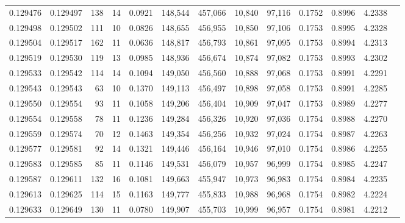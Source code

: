 \begin{tabular}{rrrrrrrrrrrrr}
0.129476 & 0.129497 &   138 &  14 &                                     0.0921 & 148,544 & 457,066 &  10,840 &  97,116 & 0.1752 & 0.8996 & 4.2338 \\
0.129498 & 0.129502 &   111 &  10 &                                     0.0826 & 148,655 & 456,955 &  10,850 &  97,106 & 0.1753 & 0.8995 & 4.2328 \\
0.129504 & 0.129517 &   162 &  11 &                                     0.0636 & 148,817 & 456,793 &  10,861 &  97,095 & 0.1753 & 0.8994 & 4.2313 \\
0.129519 & 0.129530 &   119 &  13 &                                     0.0985 & 148,936 & 456,674 &  10,874 &  97,082 & 0.1753 & 0.8993 & 4.2302 \\
0.129533 & 0.129542 &   114 &  14 &                                     0.1094 & 149,050 & 456,560 &  10,888 &  97,068 & 0.1753 & 0.8991 & 4.2291 \\
0.129543 & 0.129543 &    63 &  10 &                                     0.1370 & 149,113 & 456,497 &  10,898 &  97,058 & 0.1753 & 0.8991 & 4.2285 \\
0.129550 & 0.129554 &    93 &  11 &                                     0.1058 & 149,206 & 456,404 &  10,909 &  97,047 & 0.1753 & 0.8989 & 4.2277 \\
0.129554 & 0.129558 &    78 &  11 &                                     0.1236 & 149,284 & 456,326 &  10,920 &  97,036 & 0.1754 & 0.8988 & 4.2270 \\
0.129559 & 0.129574 &    70 &  12 &                                     0.1463 & 149,354 & 456,256 &  10,932 &  97,024 & 0.1754 & 0.8987 & 4.2263 \\
0.129577 & 0.129581 &    92 &  14 &                                     0.1321 & 149,446 & 456,164 &  10,946 &  97,010 & 0.1754 & 0.8986 & 4.2255 \\
0.129583 & 0.129585 &    85 &  11 &                                     0.1146 & 149,531 & 456,079 &  10,957 &  96,999 & 0.1754 & 0.8985 & 4.2247 \\
0.129587 & 0.129611 &   132 &  16 &                                     0.1081 & 149,663 & 455,947 &  10,973 &  96,983 & 0.1754 & 0.8984 & 4.2235 \\
0.129613 & 0.129625 &   114 &  15 &                                     0.1163 & 149,777 & 455,833 &  10,988 &  96,968 & 0.1754 & 0.8982 & 4.2224 \\
0.129633 & 0.129649 &   130 &  11 &                                     0.0780 & 149,907 & 455,703 &  10,999 &  96,957 & 0.1754 & 0.8981 & 4.2212 \\

\end{tabular}
